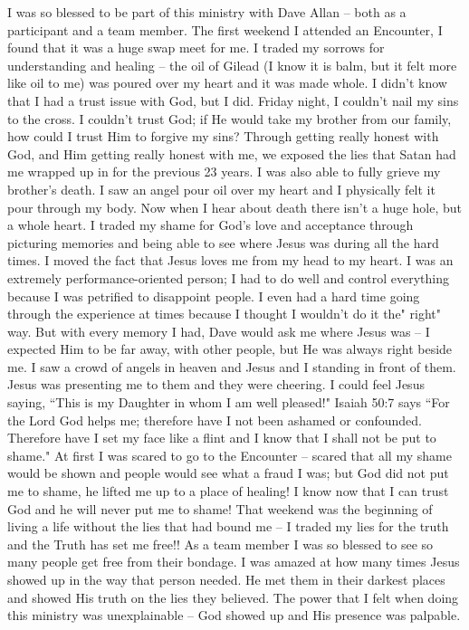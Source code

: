 \documentclass[twoside, 12pt]{book}
\begin{document}
I was so blessed to be part of this ministry with Dave Allan -- both as a participant and a team member.
The first weekend I attended an Encounter, I found that it was a huge swap meet for me. I traded my sorrows for understanding and healing -- the oil of Gilead (I know it is balm, but it felt more like oil to me) was poured over my heart and it was made whole. I didn't know that I had a trust issue with God, but I did. Friday night, I couldn't nail my sins to the cross. I couldn't trust God; if He would take my brother from our family, how could I trust Him to forgive my sins? Through getting really honest with God, and Him getting really honest with me, we exposed the lies that Satan had me wrapped up in for the previous 23 years. I was also able to fully grieve my brother's death. I saw an angel pour oil over my heart and I physically felt it pour through my body. Now when I hear about death there isn't a huge hole, but a whole heart.
I traded my shame for God's love and acceptance through picturing memories and being able to see where Jesus was during all the hard times. I moved the fact that Jesus loves me from my head to my heart.
I was an extremely performance-oriented person; I had to do well and control everything because I was petrified to disappoint people. I even had a hard time going through the experience at times because I thought I wouldn't do it the" right" way. But with every memory I had, Dave would ask me where Jesus was -- I expected Him to be far away, with other people, but He was always right beside me. I saw a crowd of angels in heaven and Jesus and I standing in front of them. Jesus was presenting me to them and they were cheering. I could feel Jesus saying, ``This is my Daughter in whom I am well pleased!"
Isaiah 50:7 says ``For the Lord God helps me; therefore have I not been ashamed or confounded. Therefore have I set my face like a flint and I know that I shall not be put to shame." At first I was scared to go to the Encounter -- scared that all my shame would be shown and people would see what a fraud I was; but God did not put me to shame, he lifted me up to a place of healing! I know now that I can trust God and he will never put me to shame!
That weekend was the beginning of living a life without the lies that had bound me -- I traded my lies for the truth and the Truth has set me free!!
As a team member I was so blessed to see so many people get free from their bondage. I was amazed at how many times Jesus showed up in the way that person needed. He met them in their darkest places and showed His truth on the lies they believed. The power that I felt when doing this ministry was unexplainable -- God showed up and His presence was palpable.
\end{document}

